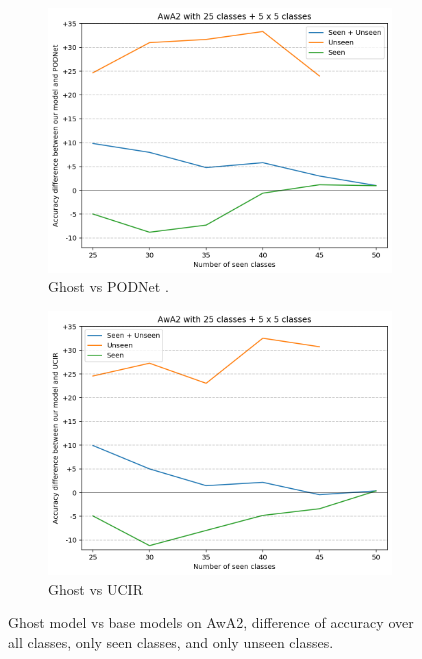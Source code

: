\begin{figure}
    \centering
    \begin{subfigure}{0.35\linewidth}
        \centering
        \includegraphics[width=\linewidth]{images/ghost/plot_awa2_25x5x5c_podnet_diff.png}
        \caption{Ghost vs PODNet \cite{douillard2020podnet}.}
    \end{subfigure}
    \begin{subfigure}{0.35\linewidth}
        \centering
        \includegraphics[width=\linewidth]{images/ghost/plot_awa2_25x5x5c_ucir_diff.png}
        \caption{Ghost vs UCIR \cite{hou2019ucir}}
    \end{subfigure}
    \caption{Ghost model vs base models on AwA2, difference of accuracy over all classes, only seen classes, and only unseen classes.}
    \label{fig:plot_awa2_25x5x5c}
\end{figure}
